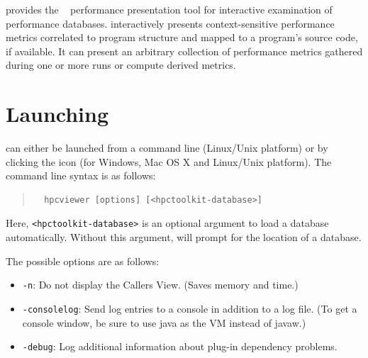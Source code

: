 

\HPCToolkit{} provides the \hpcviewer{}~\cite{Adhianto-MC-Ta:2010:PSTI-hpcviewer} performance presentation tool for interactive examination of performance databases.
\hpcviewer{} interactively presents context-sensitive performance metrics correlated to program structure and mapped to a program's source code, if available.
It can present an arbitrary collection of performance metrics gathered during one or more runs or compute derived metrics.



\section{Launching}

\hpcviewer{} can either be launched from a command line (Linux/Unix platform) or by clicking the \hpcviewer{} icon (for Windows, Mac OS X and Linux/Unix platform).
The command line syntax is as follows:
\begin{quote}
\begin{verbatim}
  hpcviewer [options] [<hpctoolkit-database>]
\end{verbatim}
\end{quote}
Here, \texttt{<hpctoolkit-database>} is an optional argument to load a database automatically.
Without this argument, \hpcviewer{} will prompt for the location of a database.

The possible options are as follows:
\begin{itemize}
 \item \texttt{-n}: Do not display the Callers View.  (Saves memory and time.)

 \item \texttt{-consolelog}: Send log entries to a console in addition to a log file.
   (To get a console window, be sure to use java as the VM instead of javaw.)

 \item \texttt{-debug}: Log additional information about plug-in dependency problems.
\end{itemize}



